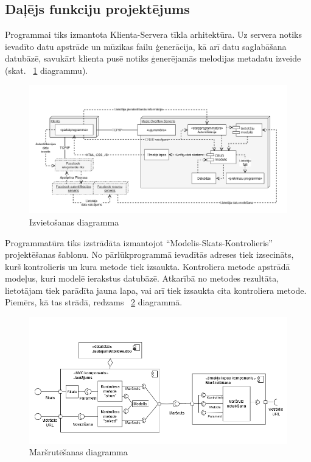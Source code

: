 \documentclass[12pt]{article}
\begin{document}
\subsection{Daļējs funkciju projektējums}

Programmai tiks izmantota Klienta-Servera tīkla arhitektūra. Uz servera notiks ievadīto datu apstrāde un mūzikas failu ģenerācija, kā arī datu saglabāšana datubāzē, savukārt klienta pusē notiks ģenerējamās melodijas metadatu izveide (skat. ~\ref{fig:deployment_diagram} diagrammu).

\begin{figure}[H]
\begin{center}
	\includegraphics[scale=0.35]{DeploymentDiagram.png}
	\caption{Izvietošanas diagramma}
	\label{fig:deployment_diagram}
\end{center}
\end{figure}

Programmatūra tiks izstrādāta izmantojot ``Modelis-Skats-Kontrolieris'' projektēšanas šablonu. No pārlūkprogrammā ievadītās adreses tiek izsecināts, kurš kontrolieris un kura metode tiek izsaukta. Kontroliera metode apstrādā modeļus, kuri modelē ierakstus datubāzē. Atkarībā no metodes rezultāta, lietotājam tiek parādīta jauna lapa, vai arī tiek izsaukta cita kontroliera metode. Piemērs, kā tas strādā, redzams ~\ref{fig:routing} diagrammā. 

\begin{figure}[H]
\begin{center}
	\includegraphics[scale=0.5]{routing.png}
	\caption{Maršrutēšanas diagramma}
	\label{fig:routing}
\end{center}
\end{figure}
\end{document}
